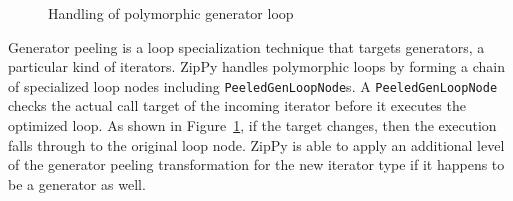 \begin{figure}
\centering
{}
\caption{Handling of polymorphic generator loop}
\label{fig:ch4-peeling-polymorphic}
\end{figure}

Generator peeling is a loop specialization technique that targets generators, a particular kind of iterators.
ZipPy handles polymorphic loops by forming a chain of specialized loop nodes including \texttt{PeeledGenLoopNode}s.
A \texttt{PeeledGenLoopNode} checks the actual call target of the incoming iterator before it executes the optimized loop.
As shown in Figure~\ref{fig:ch4-peeling-polymorphic}, if the target changes, then the execution falls through to the original loop node.
ZipPy is able to apply an additional level of the generator peeling transformation for the new iterator type if it happens to be a generator as well.

